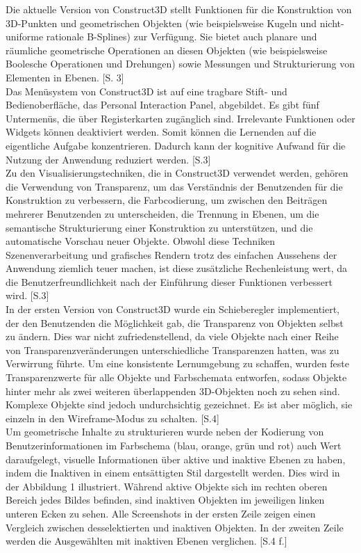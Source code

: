 \documentclass[deutsch]{llncs}
\begin{document}
Die aktuelle Version von Construct3D stellt Funktionen für die Konstruktion von 3D-Punkten und geometrischen Objekten (wie beispielsweise Kugeln und nicht-uniforme rationale B-Splines) zur Verfügung. Sie bietet auch planare und räumliche geometrische Operationen an diesen Objekten (wie beispielsweise Boolesche Operationen und Drehungen) sowie Messungen und Strukturierung von Elementen in Ebenen. [S. 3]\\
Das Menüsystem von Construct3D ist auf eine tragbare Stift- und Bedienoberfläche, das Personal Interaction Panel, abgebildet. Es gibt fünf Untermenüs, die über Registerkarten zugänglich sind. Irrelevante Funktionen oder Widgets können deaktiviert werden. Somit können die Lernenden auf die eigentliche Aufgabe konzentrieren. Dadurch kann der kognitive Aufwand für die Nutzung der Anwendung reduziert werden. [S.3]\\
Zu den Visualisierungstechniken, die in Construct3D verwendet werden, gehören die Verwendung von Transparenz, um das Verständnis der Benutzenden für die Konstruktion zu verbessern, die Farbcodierung, um zwischen den Beiträgen mehrerer Benutzenden zu unterscheiden, die Trennung in Ebenen, um die semantische Strukturierung einer Konstruktion zu unterstützen, und die automatische Vorschau neuer Objekte. Obwohl diese Techniken Szenenverarbeitung und grafisches Rendern trotz des einfachen Aussehens der Anwendung ziemlich teuer machen, ist diese zusätzliche Rechenleistung wert, da die Benutzerfreundlichkeit nach der Einführung dieser Funktionen verbessert wird. [S.3]\\
In der ersten Version von Construct3D wurde ein Schieberegler implementiert, der den Benutzenden die Möglichkeit gab, die Transparenz von Objekten selbst zu ändern. Dies war nicht zufriedenstellend, da viele Objekte nach einer Reihe von Transparenzveränderungen unterschiedliche Transparenzen hatten, was zu Verwirrung führte. Um eine konsistente Lernumgebung zu schaffen, wurden feste Transparenzwerte für alle Objekte und Farbschemata entworfen, sodass Objekte hinter mehr als zwei weiteren überlappenden 3D-Objekten noch zu sehen sind. Komplexe Objekte sind jedoch undurchsichtig gezeichnet. Es ist aber möglich, sie einzeln in den Wireframe-Modus zu schalten. [S.4]\\
Um geometrische Inhalte zu strukturieren wurde neben der Kodierung von Benutzerinformationen im Farbschema (blau, orange, grün und rot) auch Wert daraufgelegt, visuelle Informationen über aktive und inaktive Ebenen zu haben, indem die Inaktiven in einem entsättigten Stil dargestellt werden. Dies wird in der Abbildung 1 illustriert. Während aktive Objekte sich im rechten oberen Bereich jedes Bildes befinden, sind inaktiven Objekten im jeweiligen linken unteren Ecken zu sehen. Alle Screenshots in der ersten Zeile zeigen einen Vergleich zwischen desselektierten und inaktiven Objekten. In der zweiten Zeile werden die Ausgewählten mit inaktiven Ebenen verglichen. [S.4 f.]\\
 
\end{document}
